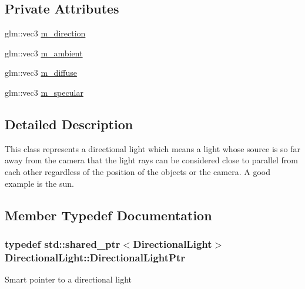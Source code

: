 \subsection*{Private Attributes}
\begin{DoxyCompactItemize}
\item 
glm\+::vec3 \hyperlink{classDirectionalLight_a4432e8ebaa81b9fe4d033056eb19ca4c}{m\+\_\+direction}
\item 
glm\+::vec3 \hyperlink{classDirectionalLight_afaf3088136b72d8af8188526e410b53a}{m\+\_\+ambient}
\item 
glm\+::vec3 \hyperlink{classDirectionalLight_aa9391a104441f2cb5cc56e976bcde89a}{m\+\_\+diffuse}
\item 
glm\+::vec3 \hyperlink{classDirectionalLight_a56e4161550e3eaa31d17c54cf108a028}{m\+\_\+specular}
\end{DoxyCompactItemize}


\subsection{Detailed Description}
This class represents a directional light which means a light whose source is so far away from the camera that the light rays can be considered close to parallel from each other regardless of the position of the objects or the camera. A good example is the sun. 

\subsection{Member Typedef Documentation}
\hypertarget{classDirectionalLight_abb43c478c01d5e7c158699e9f3661bce}{
\subsubsection[{Directional\+Light\+Ptr}]{\setlength{\rightskip}{0pt plus 5cm}typedef std\+::shared\+\_\+ptr$<${\bf Directional\+Light}$>$ {\bf Directional\+Light\+::\+Directional\+Light\+Ptr}}}\label{classDirectionalLight_abb43c478c01d5e7c158699e9f3661bce}
Smart pointer to a directional light 

